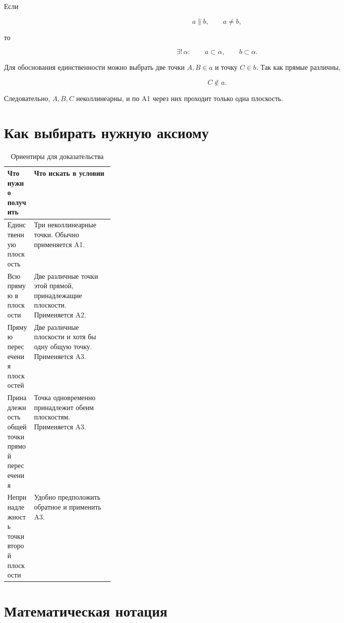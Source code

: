 \documentclass[a4paper,12pt]{article}
\begin{document}
Если

\[
a\parallel b,
\qquad
a\ne b,
\]

то

\[
\boxed{
\exists!\,\alpha:
\qquad
a\subset\alpha,
\qquad
b\subset\alpha.
}
\]

Для обоснования единственности можно выбрать две точки \(A,B\in a\)
и точку \(C\in b\). Так как прямые различны,

\[
C\notin a.
\]

Следовательно, \(A,B,C\) неколлинеарны,
и по A1 через них проходит только одна плоскость.


\section{Как выбирать нужную аксиому}

\begin{table}[ht]
\centering
\caption{Ориентиры для доказательства}
\begin{tabularx}{\linewidth}{@{}p{0.25\linewidth}X@{}}
\toprule
\textbf{Что нужно получить} & \textbf{Что искать в условии} \\
\midrule

Единственную плоскость
&
Три неколлинеарные точки. Обычно применяется A1.
\\

Всю прямую в плоскости
&
Две различные точки этой прямой, принадлежащие плоскости.
Применяется A2.
\\

Прямую пересечения плоскостей
&
Две различные плоскости и хотя бы одну общую точку.
Применяется A3.
\\

Принадлежность общей точки прямой пересечения
&
Точка одновременно принадлежит обеим плоскостям.
Применяется A3.
\\

Непринадлежность точки второй плоскости
&
Удобно предположить обратное и применить A3.
\\

\bottomrule
\end{tabularx}
\end{table}


\section{Математическая нотация}
\end{document}
